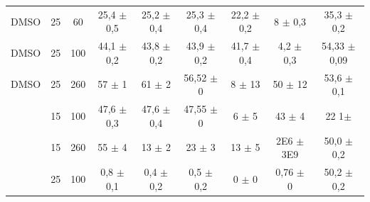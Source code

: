 \begin{table}[h]
\begin{adjustbox}{angle=90}
{\begin{tabular}{c c c | c c c c c c}
		DMSO    & 25         & 60         & 25,4    \(\pm\) 0,5 & 25,2     \(\pm\) 0,4 & 25,3     \(\pm\) 0,4 & 22,2        \(\pm\) 0,2 & 8           \(\pm\) 0,3 & 35,3  \(\pm\)  0,2 \\
		DMSO    & 25         & 100        & 44,1    \(\pm\) 0,2 & 43,8     \(\pm\) 0,2 & 43,9     \(\pm\) 0,2 & 41,7        \(\pm\) 0,4 & 4,2         \(\pm\) 0,3 & 54,33 \(\pm\)  0,09 \\
		DMSO    & 25         & 260        & 57      \(\pm\) 1   & 61       \(\pm\) 2   & 56,52    \(\pm\) 0   & 8           \(\pm\) 13  & 50          \(\pm\) 12  & 53,6  \(\pm\)  0,1 \\ 
		\BD{}    & 15         & 100        & 47,6    \(\pm\) 0,3 & 47,6     \(\pm\) 0,4 & 47,55    \(\pm\) 0   & 6           \(\pm\) 5   & 43          \(\pm\) 4   & 22  1\(\pm\) \\
		\BD{}    & 15         & 260        & 55      \(\pm\) 4   & 13       \(\pm\) 2   & 23       \(\pm\) 3   & 13          \(\pm\) 5   & 2E6       \(\pm\) 3E9   & 50,0  \(\pm\)  0,2 \\
		\BD{}    & 25         & 100        & 0,8     \(\pm\) 0,1 & 0,4      \(\pm\) 0,2 & 0,5      \(\pm\) 0,2 & 0           \(\pm\) 0   & 0,76        \(\pm\) 0   & 50,2  \(\pm\)  0,2 \\ \bottomrule
		\end{tabular}
	}{} \end{adjustbox}
\end{table} 

